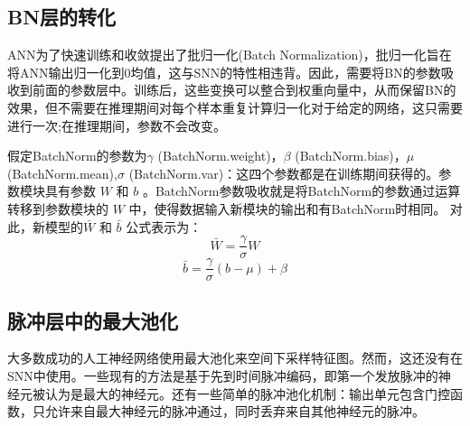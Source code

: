 \subsection{BN层的转化}
\par
ANN为了快速训练和收敛提出了批归一化(Batch Normalization)，批归一化旨在将ANN输出归一化到0均值，这与SNN的特性相违背。因此，需要将BN的参数吸收到前面的参数层中。训练后，这些变换可以整合到权重向量中，从而保留BN的效果，但不需要在推理期间对每个样本重复计算归一化对于给定的网络，这只需要进行一次;在推理期间，参数不会改变。
\par
假定BatchNorm的参数为$\gamma$ (BatchNorm.weight)，$\beta$ (BatchNorm.bias)，$\mu$ (BatchNorm.mean),$\sigma$ (BatchNorm.var)：这四个参数都是在训练期间获得的。参数模块具有参数 $W$ 和 $b$ 。BatchNorm参数吸收就是将BatchNorm的参数通过运算转移到参数模块的 $W$
中，使得数据输入新模块的输出和有BatchNorm时相同。 对此，新模型的$\bar{W}$ 和 $\bar{b}$ 公式表示为：
\[
\bar{W} = \frac{\gamma}{\sigma}W
\]
\[
\bar{b} = \frac{\gamma}{\sigma}(b-\mu) + \beta
\]
\subsection{脉冲层中的最大池化}
\par
大多数成功的人工神经网络使用最大池化来空间下采样特征图。然而，这还没有在SNN中使用。一些现有的方法是基于先到时间脉冲编码，即第一个发放脉冲的神经元被认为是最大的神经元。还有一些简单的脉冲池化机制：输出单元包含门控函数，只允许来自最大神经元的脉冲通过，同时丢弃来自其他神经元的脉冲。